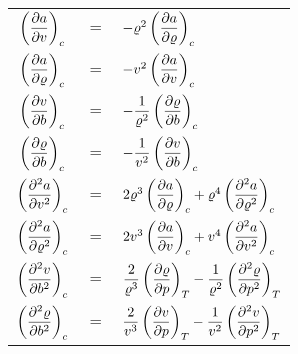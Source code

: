 {\setlength{\tabcolsep}{.2em}
\begin{tabularx}{\linewidth}{ccl}
\toprule
$\der{a}{v}{c}$ & $=$ & $-\varrho^2 \der{a}{\varrho}{c}$ \\[12pt]
$\der{a}{\varrho}{c}$ & $=$ & $-v^2 \der{a}{v}{c}$ \\
\midrule
$\der{v}{b}{c}$ & $=$ & $-\dfrac{1}{\varrho^2} \der{\varrho}{b}{c}$ \\[12pt]
$\der{\varrho}{b}{c}$ & $=$ & $-\dfrac{1}{v^2} \der{v}{b}{c}$ \\
\midrule[1pt]
$\der{^2 a}{v^2}{c}$ & $=$ & $2\varrho^3 \der{a}{\varrho}{c} + \varrho^4 \der{^2 a}{\varrho^2}{c}$ \\[12pt]
$\der{^2 a}{\varrho^2}{c}$ & $=$ & $2v^3 \der{a}{v}{c} + v^4 \der{^2 a}{v^2}{c}$ \\
\midrule
$\der{^2 v}{b^2}{c}$ & $=$ & $\dfrac{2}{\varrho^3} \der{\varrho}{p}{T} - \dfrac{1}{\varrho^2} \der{^2 \varrho}{p^2}{T}$ \\[12pt]
$\der{^2 \varrho}{b^2}{c}$ & $=$ & $\dfrac{2}{v^3} \der{v}{p}{T} - \dfrac{1}{v^2} \der{^2 v}{p^2}{T}$ \\
\bottomrule
\end{tabularx}%
}